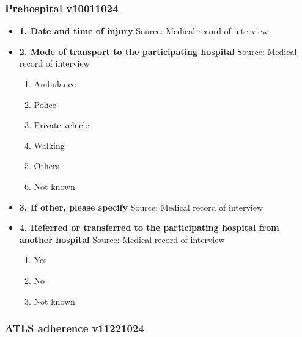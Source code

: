 \documentclass[
]{scrartcl}
\providecommand{\tightlist}{%
  \setlength{\itemsep}{0pt}\setlength{\parskip}{0pt}}\usepackage{longtable,booktabs,array}
\begin{document}
\hypertarget{prehospital-v10011024}{%
\subsubsection{Prehospital v10011024}\label{prehospital-v10011024}}

\begin{itemize}
\item
  \textbf{1. Date and time of injury} Source: Medical record of
  interview
\item
  \textbf{2. Mode of transport to the participating hospital} Source:
  Medical record of interview

  \begin{enumerate}
  \def\labelenumi{\arabic{enumi}.}
  \tightlist
  \item
    Ambulance
  \item
    Police
  \item
    Private vehicle
  \item
    Walking
  \item
    Others
  \item
    Not known
  \end{enumerate}
\item
  \textbf{3. If other, please specify} Source: Medical record of
  interview
\item
  \textbf{4. Referred or transferred to the participating hospital from
  another hospital} Source: Medical record of interview

  \begin{enumerate}
  \def\labelenumi{\arabic{enumi}.}
  \tightlist
  \item
    Yes
  \item
    No
  \item
    Not known
  \end{enumerate}
\end{itemize}

\hypertarget{atls-adherence-v11221024}{%
\subsubsection{ATLS adherence
v11221024}\label{atls-adherence-v11221024}}
\end{document}
